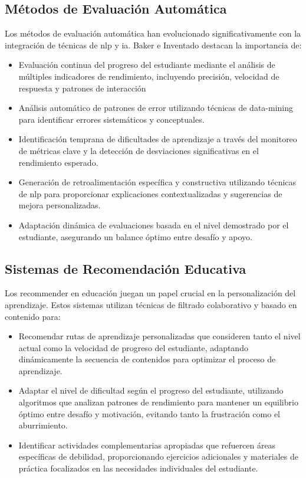 \subsection{Métodos de Evaluación Automática}

Los métodos de evaluación automática han evolucionado significativamente con la integración de técnicas de \gls{nlp} y \gls{ia}. Baker e Inventado \cite{baker2014educational} destacan la importancia de:

\begin{itemize}
  \item Evaluación continua del progreso del estudiante mediante el análisis de múltiples indicadores de rendimiento, incluyendo precisión, velocidad de respuesta y patrones de interacción

  \item Análisis automático de patrones de error utilizando técnicas de \gls{data-mining} para identificar errores sistemáticos y conceptuales.

  \item Identificación temprana de dificultades de aprendizaje a través del monitoreo de métricas clave y la detección de desviaciones significativas en el rendimiento esperado.

  \item Generación de retroalimentación específica y constructiva utilizando técnicas de \gls{nlp} para proporcionar explicaciones contextualizadas y sugerencias de mejora personalizadas.

  \item Adaptación dinámica de evaluaciones basada en el nivel demostrado por el estudiante, asegurando un balance óptimo entre desafío y apoyo.
\end{itemize}

\subsection{Sistemas de Recomendación Educativa}
Los \gls{recommender} en educación juegan un papel crucial en la personalización del aprendizaje. Estos sistemas utilizan técnicas de filtrado colaborativo y basado en contenido para:

\begin{itemize}
  \item Recomendar rutas de aprendizaje personalizadas que consideren tanto el nivel actual como la velocidad de progreso del estudiante, adaptando dinámicamente la secuencia de contenidos para optimizar el proceso de aprendizaje.

  \item Adaptar el nivel de dificultad según el progreso del estudiante, utilizando algoritmos que analizan patrones de rendimiento para mantener un equilibrio óptimo entre desafío y motivación, evitando tanto la frustración como el aburrimiento.

  \item Identificar actividades complementarias apropiadas que refuercen áreas específicas de debilidad, proporcionando ejercicios adicionales y materiales de práctica focalizados en las necesidades individuales del estudiante.
\end{itemize}

